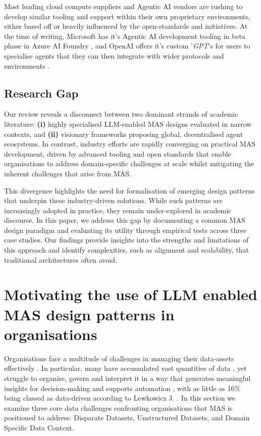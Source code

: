\documentclass{article}
\begin{document}
Most leading cloud compute suppliers and Agentic AI vendors are rushing to develop similar tooling and support within their own proprietary environments, either based off or heavily influenced by the open-standards and initiatives. At the time of writing, Microsoft has it's Agentic AI development tooling in beta phase in Azure AI Foundry \cite{microsoft2025aifoundry}, and OpenAI offers it's custom '\emph{GPT}'s for users to specialise agents that they can then integrate with wider protocols and environments \cite{eloundou2024gpts}.

\subsection{Research Gap} \label{sect:gap}

Our review reveals a disconnect between two dominant strands of academic literature: \textbf{(i)} highly specialised LLM-enabled MAS designs evaluated in narrow contexts, and \textbf{(ii)} visionary frameworks proposing global, decentralised agent ecosystems. In contrast, industry efforts are rapidly converging on practical MAS development, driven by advanced tooling and open standards that enable organisations to address domain-specific challenges at scale whilst mitigating the inherent challenges that arise from MAS.

This divergence highlights the need for formalisation of emerging design patterns that underpin these industry-driven solutions. While such patterns are increasingly adopted in practice, they remain under-explored in academic discourse. In this paper, we address this gap by documenting a common MAS design paradigm and evaluating its utility through empirical tests across three case studies. Our findings provide insights into the strengths and limitations of this approach and identify complexities, such as alignment and scalability, that traditional architectures often avoid.

\section{Motivating the use of LLM enabled MAS design patterns in organisations} \label{sect:keychallenges}

Organisations face a multitude of challenges in managing their data-assets effectively \cite{sarker2022comprehensive, escobar2021quality}. In particular, many have accumulated vast quantities of data \cite{Pallardy2024howmuchdata}, yet struggle to organise, govern and interpret it in a way that generates meaningful insights for decision-making and supports automation \cite{ugarte2021data, Sellbery2025howmuchdata}, with as little as 16\% being classed as data-driven according to Lewkowicz J. \cite{Lewkowicz2024datafocus}. 
In this section we examine three core data challenges confronting organisations that MAS is positioned to address: Disparate Datasets, Unstructured Datasets, and Domain Specific Data Context.
\end{document}
